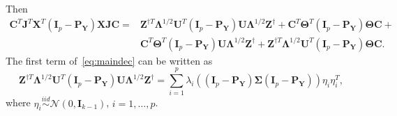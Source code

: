 \documentclass[12pt]{article} %
\newcommand{\bZ}{\mathbf{Z}}
\newcommand{\bX}{\mathbf{X}}
\newcommand{\bP}{\mathbf{P}}
\newcommand{\bY}{\mathbf{Y}}
\newcommand{\bJ}{\mathbf{J}}
\newcommand{\bC}{\mathbf{C}}
\newcommand{\bI}{\mathbf{I}}
\newcommand{\bU}{\mathbf{U}}
\newcommand{\bfsym}[1]{\ensuremath{\boldsymbol{#1}}}
\def\bLambda {\bfsym {\Lambda}}
\def\bSigma {\bfsym {\Sigma}}
\def\bTheta {\bfsym {\Theta}}
\theoremstyle{definition}
\begin{document}
\begin{appendices}
Then 
\begin{equation}\label{eq:maindec}
\begin{aligned}
\bC^T\bJ^T \bX^T(\bI_p-\bP_{\bY}) \bX\bJ\bC
=&
\bZ^{\dagger T} \bLambda^{1/2}\bU^T (\bI_p-\bP_{\bY})\bU\bLambda^{1/2}\bZ^{\dagger}+
 \bC^T \bTheta^T (\bI_p -\bP_{\bY})\bTheta \bC+\\
 & \bC^T \bTheta^T (\bI_p -\bP_{\bY})\bU\bLambda^{1/2}\bZ^{\dagger}+
 \bZ^{\dagger T} \bLambda^{1/2}\bU^T (\bI_p-\bP_{\bY})\bTheta \bC.
\end{aligned}
\end{equation}
    The first term of~\eqref{eq:maindec} can be written as
\begin{equation}\label{eq:firstTerm}
    \bZ^{\dagger T} \bLambda^{1/2}\bU^T (\bI_p-\bP_{\bY})\bU\bLambda^{1/2}\bZ^{\dagger}=
\sum_{i=1}^p \lambda_i ( (\bI_p-\bP_{\bY})\bSigma (\bI_p-\bP_{\bY}))\eta_i \eta_i^T,
\end{equation}
where $\eta_i\overset{iid}{\sim} \mathcal{N}(0,\bI_{k-1})$, $i=1,\ldots,p$.








\end{appendices}
\end{document}
